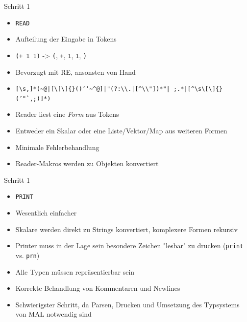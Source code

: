 \documentclass[presentation]{beamer}
\begin{document}
\begin{frame}[fragile,label=sec-3-8]{Schritt 1}
 \begin{itemize}
\item \texttt{READ}
\item Aufteilung der Eingabe in Tokens
\item \texttt{(+ 1 1)} -> \texttt{(}, \texttt{+}, \texttt{1}, \texttt{1}, \texttt{)}
\item Bevorzugt mit RE, ansonsten von Hand
\item \texttt{[\textbackslash{}s,]*(\textasciitilde{}@|[\textbackslash{}[\textbackslash{}]\{\}()'`\textasciitilde{}\textasciicircum{}@]|"(?:\textbackslash{}\textbackslash{}.|[\textasciicircum{}\textbackslash{}\textbackslash{}"])*"| ;.*|[\textasciicircum{}\textbackslash{}s\textbackslash{}[\textbackslash{}]\{\}('"`,;)]*)}
\item Reader liest eine \emph{Form} aus Tokens
\item Entweder ein Skalar oder eine Liste/Vektor/Map aus weiteren Formen
\item Minimale Fehlerbehandlung
\item Reader-Makros werden zu Objekten konvertiert
\end{itemize}
\end{frame}

\begin{frame}[fragile,label=sec-3-9]{Schritt 1}
 \begin{itemize}
\item \texttt{PRINT}
\item Wesentlich einfacher
\item Skalare werden direkt zu Strings konvertiert, komplexere Formen
rekursiv
\item Printer muss in der Lage sein besondere Zeichen "lesbar" zu drucken
(\texttt{print} vs. \texttt{prn})
\item Alle Typen müssen repräsentierbar sein
\item Korrekte Behandlung von Kommentaren und Newlines
\item Schwierigster Schritt, da Parsen, Drucken und Umsetzung des
Typsystems von MAL notwendig sind
\end{itemize}
\end{frame}
\end{document}
